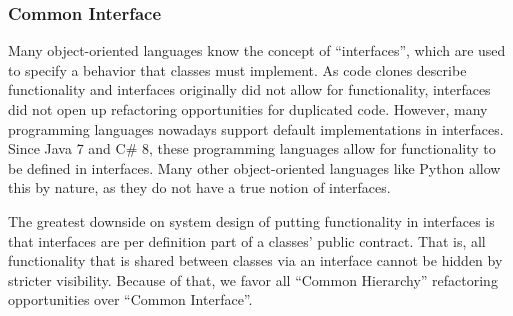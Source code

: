 \documentclass[runningheads]{llncs}
\begin{document}


\subsubsection{Common Interface}
Many object-oriented languages know the concept of ``interfaces'', which are used to specify a behavior that classes must implement. As code clones describe functionality and interfaces originally did not allow for functionality, interfaces did not open up refactoring opportunities for duplicated code. However, many programming languages nowadays support default implementations in interfaces. Since Java 7 and C\# 8, these programming languages allow for functionality to be defined in interfaces. Many other object-oriented languages like Python allow this by nature, as they do not have a true notion of interfaces.

The greatest downside on system design of putting functionality in interfaces is that interfaces are per definition part of a classes' public contract. That is, all functionality that is shared between classes via an interface cannot be hidden by stricter visibility. Because of that, we favor all ``Common Hierarchy'' refactoring opportunities over ``Common Interface''.

\end{document}
